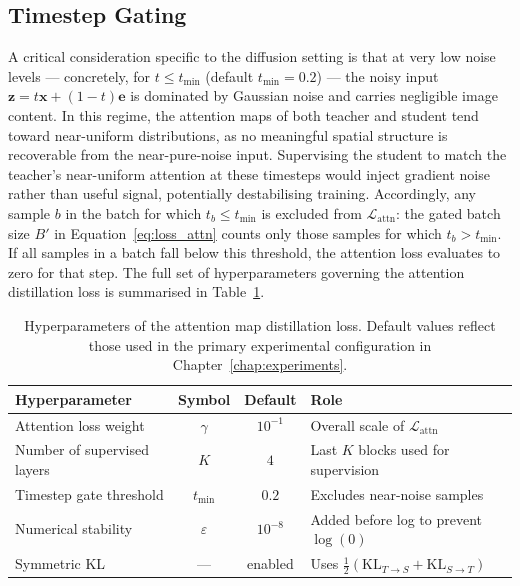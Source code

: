\subsection*{Timestep Gating}

A critical consideration specific to the diffusion setting is that at very low noise levels — concretely, for $t \leq t_{\min}$ (default $t_{\min} = 0.2$) — the noisy input $\mathbf{z} = t\mathbf{x} + (1-t)\mathbf{e}$ is dominated by Gaussian noise and carries negligible image content. In this regime, the attention maps of both teacher and student tend toward near-uniform distributions, as no meaningful spatial structure is recoverable from the near-pure-noise input. Supervising the student to match the teacher's near-uniform attention at these timesteps would inject gradient noise rather than useful signal, potentially destabilising training. Accordingly, any sample $b$ in the batch for which $t_b \leq t_{\min}$ is excluded from $\mathcal{L}_{\text{attn}}$: the gated batch size $B'$ in Equation~\eqref{eq:loss_attn} counts only those samples for which $t_b > t_{\min}$. If all samples in a batch fall below this threshold, the attention loss evaluates to zero for that step. The full set of hyperparameters governing the attention distillation loss is summarised in Table~\ref{tab:attn_hyperparams}.

\begin{table}[ht]
    \centering
    \caption{Hyperparameters of the attention map distillation loss. Default values reflect those used in the primary experimental configuration in Chapter~\ref{chap:experiments}.}
    \label{tab:attn_hyperparams}
    \begin{tabular}{lccl}
        \toprule
        \textbf{Hyperparameter} & \textbf{Symbol} & \textbf{Default} & \textbf{Role} \\
        \midrule
        Attention loss weight    & $\gamma$       & $10^{-1}$         & Overall scale of $\mathcal{L}_{\text{attn}}$ \\
        Number of supervised layers & $K$         & $4$               & Last $K$ blocks used for supervision \\
        Timestep gate threshold  & $t_{\min}$    & $0.2$             & Excludes near-noise samples \\
        Numerical stability      & $\varepsilon$ & $10^{-8}$         & Added before log to prevent $\log(0)$ \\
        Symmetric KL             & ---           & enabled           & Uses $\frac{1}{2}(\mathrm{KL}_{T\to S} + \mathrm{KL}_{S\to T})$ \\
        \bottomrule
    \end{tabular}
\end{table}

